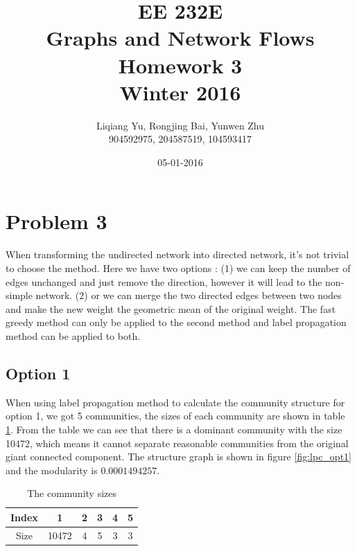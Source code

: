 \documentclass{article}
\begin{document}
\begin{titlepage}
\title{EE 232E \\Graphs and Network Flows\\Homework 3\\Winter 2016} 
\author{Liqiang Yu, Rongjing Bai, Yunwen Zhu\\
904592975, 204587519, 104593417}  %
\date{05-01-2016}
\end{titlepage}
\maketitle
\newpage
\tableofcontents
\newpage
\section{Problem 3}
When transforming the undirected network into directed network, it's not trivial to choose the method. Here we have two options : (1) we can keep the number of edges unchanged and just remove the direction, however it will lead to the  non-simple network. (2) or we can merge the two directed edges between two nodes and make the new weight the geometric mean of the original weight. The fast greedy method can only be applied to the second method and label propagation method can be applied to both.
\subsection{Option 1}
When using label propagation method to calculate the community structure for option 1, we got 5 communities, the sizes of each community are shown in table \ref{tb:p3_comsize}. From the table we can see that there is a dominant community with the size 10472, which means it cannot separate reasonable communities from the original giant connected component. The structure graph is shown in figure \ref{fig:lpc_opt1} and the modularity is $0.0001494257$.
\begin {table}[htbp]
\caption{The community sizes}
\begin{adjustbox}{center}
\label{tb:p3_comsize}
\begin{tabular}{|c|c|c|c|c|c|}
\hline
Index&1&2&3&4&5\\
\hline
Size&10472&4&5&3&3\\
\hline
\end{tabular}
\end{adjustbox}
\end{table}
\end{document}
